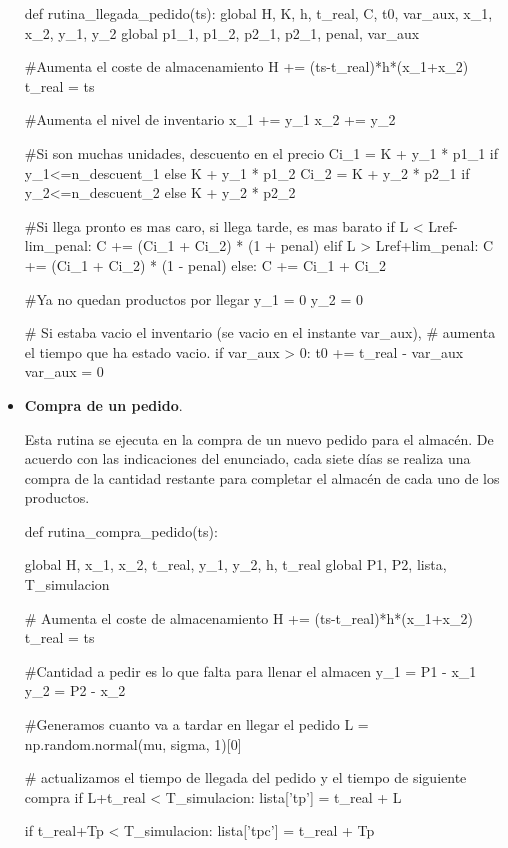 \documentclass[a4paper,12pt]{article}
\begin{document}
\begin{itemize}
	\begin{python}
def rutina_llegada_pedido(ts):
	global H, K, h, t_real, C, t0, var_aux, x_1, x_2, y_1, y_2
	global p1_1, p1_2, p2_1, p2_1, penal, var_aux
	
	#Aumenta el coste de almacenamiento
	H += (ts-t_real)*h*(x_1+x_2)
	t_real = ts
	
	#Aumenta el nivel de inventario
	x_1 += y_1
	x_2 += y_2
	
	#Si son muchas unidades, descuento en el precio
	Ci_1 = K + y_1 * p1_1 if y_1<=n_descuent_1 else K + y_1 * p1_2
	Ci_2 = K + y_2 * p2_1 if y_2<=n_descuent_2 else K + y_2 * p2_2
	
	#Si llega pronto es mas caro, si llega tarde, es mas barato
	if L < Lref-lim_penal:
		C += (Ci_1 + Ci_2) * (1 + penal)
	elif L > Lref+lim_penal:
		C += (Ci_1 + Ci_2) * (1 - penal)
	else:
		C += Ci_1 + Ci_2
		
	#Ya no quedan productos por llegar
	y_1 = 0
	y_2 = 0
	
	# Si estaba vacio el inventario (se vacio en el instante var_aux),
	# aumenta el tiempo que ha estado vacio.
	if var_aux > 0:
		t0 += t_real - var_aux
		var_aux = 0
	\end{python}
	
	\item \textbf{Compra de un pedido}. 
	
	Esta rutina se ejecuta en la compra de un nuevo pedido para el almacén. De acuerdo con las indicaciones del enunciado, cada siete días se realiza una compra de la cantidad restante para completar el almacén de cada uno de los productos. \\
	
	\begin{python}
def rutina_compra_pedido(ts):

	global H, x_1, x_2, t_real, y_1, y_2, h, t_real
	global P1, P2, lista, T_simulacion
	
	# Aumenta el coste de almacenamiento
	H += (ts-t_real)*h*(x_1+x_2)
	t_real = ts
	
	#Cantidad a pedir es lo que falta para llenar el almacen
	y_1 = P1 - x_1
	y_2 = P2 - x_2
	
	#Generamos cuanto va a tardar en llegar el pedido
	L = np.random.normal(mu, sigma, 1)[0]
	
	# actualizamos el tiempo de llegada del pedido y el tiempo de siguiente compra
	if L+t_real < T_simulacion:
		lista['tp'] = t_real + L
	
	if t_real+Tp < T_simulacion:
		lista['tpc'] = t_real + Tp
	\end{python}
	
	\end{itemize}
	
\end{document}
